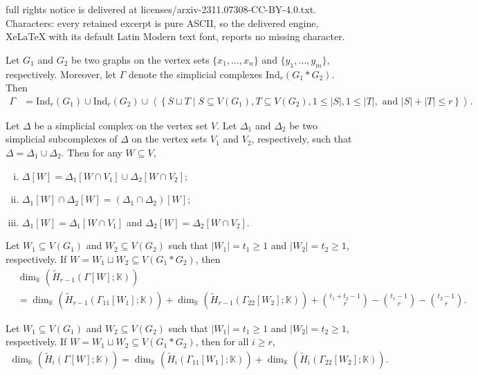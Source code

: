 \documentclass[10pt,a4paper]{amsart}
\newcommand{\K}{\mathbb K}
\begin{document}
full rights notice is delivered at licenses/arxiv-2311.07308-CC-BY-4.0.txt. Characters: every retained excerpt is pure ASCII, so the delivered engine, XeLaTeX with its default Latin Modern text font, reports no missing character.
\begin{proposition}\label{prop1}
    Let $G_1$ and $G_2$ be two graphs on the vertex sets $\{x_1,\ldots,x_n\}$ and $\{y_1,\ldots,y_m\}$, respectively. Moreover, let $\Gamma$ denote the simplicial complexes $\mathrm{Ind}_r(G_1*G_2)$. Then 
    {\footnotesize
    \begin{align*}
        \Gamma&=\mathrm{Ind}_r(G_1)\cup \mathrm{Ind}_r(G_2)\cup \left\langle\left\{S\sqcup T\mid S\subseteq V(G_1), T\subseteq V(G_2), 1\le |S|, 1\le |T|, \text{ and } |S|+|T|\le r\right\}\right\rangle .
    \end{align*}
}
\end{proposition}

\begin{proposition}\label{subcomplex on subset}
    Let $\Delta$ be a simplicial complex on the vertex set $V$. Let $\Delta_1$ and $\Delta_2$ be two simplicial subcomplexes of $\Delta$ on the vertex sets $V_1$ and $V_2$, respectively, such that $\Delta=\Delta_1\cup\Delta_2$. Then for any $W\subseteq V$,
\begin{enumerate}[(i)]
    \item $\Delta[W]=\Delta_1[W\cap V_1]\cup\Delta_2[W\cap V_2]$;
    \item $\Delta_1[W]\cap\Delta_2[W]=(\Delta_1\cap\Delta_2)[W]$;
    \item $\Delta_1[W]=\Delta_1[W\cap V_1]$ and $\Delta_2[W]=\Delta_2[W\cap V_2]$.
\end{enumerate}
\end{proposition}

\begin{lemma}\label{r-1 homology lemma}
    Let $W_1\subseteq V(G_1)$ and $W_2\subseteq V(G_2)$ such that $|W_1|=t_1\ge 1$ and $|W_2|=t_2\ge 1$, respectively. If $W=W_1\sqcup W_2\subseteq V(G_1*G_2)$, then
{\footnotesize
    \begin{align*}
     &\dim_{\K}(\widetilde H_{r-1}(\Gamma[W];\K))\\
     &=\dim_{\K}(\widetilde H_{r-1}(\Gamma_{11}[W_1];\K))+\dim_{\K}(\widetilde H_{r-1}(\Gamma_{22}[W_2];\K))+{t_1+t_2-1\choose r}-{t_1-1\choose r}-{t_2-1\choose r}.   
    \end{align*}}
     \end{lemma}

\begin{lemma}\label{i homology lemma}
    Let $W_1\subseteq V(G_1)$ and $W_2\subseteq V(G_2)$ such that $|W_1|=t_1\ge 1$ and $|W_2|=t_2\ge 1$, respectively. If $W=W_1\sqcup W_2\subseteq V(G_1*G_2)$, then for all $i\ge r$,
{\footnotesize
    \begin{align*}
     \dim_{\K}(\widetilde H_{i}(\Gamma[W];\K))=\dim_{\K}(\widetilde H_{i}(\Gamma_{11}[W_1];\K))+\dim_{\K}(\widetilde H_{i}(\Gamma_{22}[W_2];\K)).   
    \end{align*}}
     \end{lemma}
\end{document}
